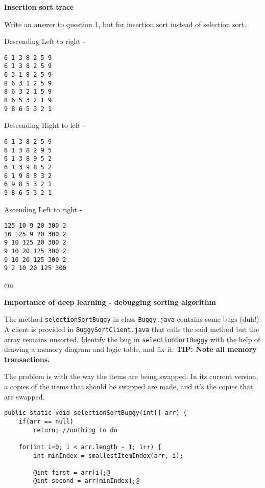 \begin{questions}
\begin{parts}
\begin{solution}
\begin{verbatim}
\end{verbatim}
\end{solution}
\end{parts}

\vskip 0.5cm
\question  \textbf{Insertion sort trace} \vskip 0.5cm

Write an answer to question 1, but for insertion sort instead of selection sort.

\begin{solution}
Descending Left to right -
\begin{verbatim}
6 1 3 8 2 5 9
6 1 3 8 2 5 9
6 3 1 8 2 5 9
8 6 3 1 2 5 9
8 6 3 2 1 5 9
8 6 5 3 2 1 9
9 8 6 5 3 2 1
\end{verbatim}

Descending Right to left -
\begin{verbatim}
6 1 3 8 2 5 9
6 1 3 8 2 9 5
6 1 3 8 9 5 2
6 1 3 9 8 5 2
6 1 9 8 5 3 2
6 9 8 5 3 2 1
9 8 6 5 3 2 1
\end{verbatim}

Ascending Left to right -
\begin{verbatim}
125 10 9 20 300 2
10 125 9 20 300 2
9 10 125 20 300 2
9 10 20 125 300 2
9 10 20 125 300 2
9 2 10 20 125 300
\end{verbatim}
\end{solution}

 cm 

\question  \textbf{Importance of deep learning - debugging sorting algorithm} \vskip 0.5cm

The method \texttt{selectionSortBuggy} in class \texttt{Buggy.java} contains some bugs (duh!).
A client is provided in \texttt{BuggySortClient.java} that calls the said method but the array remains unsorted. Identify the bug in \texttt{selectionSortBuggy} with the help of drawing a memory diagram and logic table, and fix it. \textbf{TIP: Note all memory transactions.}

\begin{solution}
The problem is with the way the items are being swapped. In its current version, a copies of the items that should be swapped are made, and it's the copies that are swapped.

\begin{lstlisting}[style=buggy]
public static void selectionSortBuggy(int[] arr) {
	if(arr == null)
		return; //nothing to do
		
	for(int i=0; i < arr.length - 1; i++) {
		int minIndex = smallestItemIndex(arr, i);
		
		@int first = arr[i];@
		@int second = arr[minIndex];@
		

\end{lstlisting}
\end{solution}
\end{questions}
